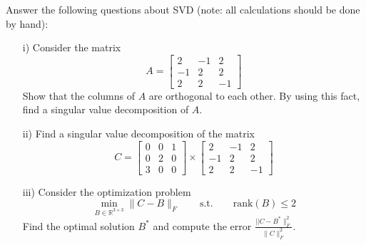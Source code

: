 \begin{homeworkProblem}

    Answer the following questions about SVD (note: all calculations 
    should be done by hand):
    \begin{itemize} 
        \item [i)] Consider the matrix
        \begin{equation}
            A=\left[\begin{array}{ccc} 2 & -1 & 2\\ -1 & 2 & 2\\ 
            2 & 2 & -1\end{array}\right]
        \end{equation}
        Show that the columns of $A$ are orthogonal to each other. By using 
        this fact, find a singular value decomposition of $A$.

        \item [ii)] Find a singular value decomposition of the matrix 
        \begin{equation}
            C= \left[\begin{array}{ccc} 0 & 0 & 1\\ 0 & 2 & 0\\3 & 0& 0
            \end{array}\right]\times \left[\begin{array}{ccc} 2 & -1 & 2\\ 
            -1 & 2 & 2\\ 2 & 2 & -1\end{array}\right]
        \end{equation}

        \item [iii)] Consider the optimization problem
        \begin{equation}
            \min_{B\in\mathbb R^{3\times3}} \|C-B\|_F\qquad\text{s.t.}\qquad 
            \text{rank}(B)\leq 2
        \end{equation}
        Find the optimal solution $B^*$ and compute the error 
        $\frac{||C-B^*\|_F^2}{\|C\|_F^2}$.

    \end{itemize}


\end{homeworkProblem}
